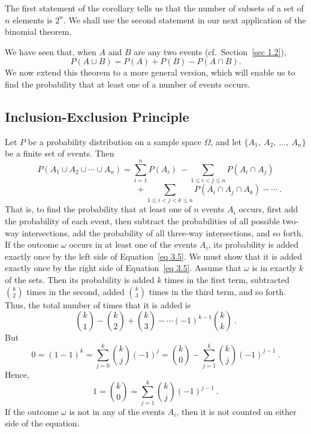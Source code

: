 The first statement of the corollary tells us that the number of subsets of a set of
$n$ elements is $2^n$.  We shall use the second statement in our next application of
the binomial theorem.

We have seen that, when $A$ and $B$ are any two events (cf.~Section~\ref{sec 1.2}),  
$$ P(A \cup B) = P(A) + P(B) - P(A \cap B).
$$ We now extend this theorem to a more general version, which will enable us to find
the probability that at least one of a number of events occurs.

\subsection*{Inclusion-Exclusion Principle}

\begin{theorem}\label{thm 3.10} Let $P$ be a probability distribution on a sample space
$\Omega$, and let
$\{A_1,\ A_2,\ \dots,\ A_n\}$ be a finite set of events.  Then
$$ P(A_1 \cup A_2 \cup \cdots \cup A_n)  =  \sum_{i = 1}^n P(A_i)\ - 
\sum_{1 \leq i < j \leq n} P(A_i \cap A_j) 
$$
\begin{equation} 
\ \ \ \ \ \ \ \ \ \ \ \ \ \ \ \ \ \ \ \ \ \ \ \ \ \ \ \ \ \ \ \ \ \ \ \ \ \ \ \ \ \ \
\ 
\ \ \ \ \ \ \ \ \ \ \ \ \  + \sum_{1 \leq i < j < k \leq n} P(A_i \cap A_j \cap A_k) -
\cdots\ .\label{eq 3.5}
\end{equation}
That is, to find the probability that at least one of $n$ events $A_i$ occurs, first add the
probability of each event, then subtract the probabilities of all possible two-way
intersections, add the probability of all three-way intersections, and so forth.
\proof If the outcome $\omega$ occurs in at least one of the events $A_i$, its probability is added
exactly once by the left side of Equation~\ref{eq 3.5}.  We must show that it is added
exactly once by the right side of  Equation~\ref{eq 3.5}.  Assume that $\omega$ is in
exactly $k$ of the sets.   Then its probability is added $k$ times in the first term,
subtracted $k \choose 2$  times in the second, added $k \choose 3$ times in the third
term, and so forth.   Thus, the total number of times that it is added is
$$ {k \choose 1} - {k \choose 2} + {k \choose 3} - \cdots {(-1)^{k-1}} {k \choose k}\ .
$$ But
$$ 0 = (1 - 1)^k = \sum_{j = 0}^k {k \choose j} (-1)^j = {k \choose 0} - \sum_{j = 1}^k
{k \choose j} {(-1)^{j - 1}}\ .
$$ Hence,
$$ 1 = {k \choose 0} = \sum_{j = 1}^k {k \choose j} {(-1)^{j - 1}}\ .
$$
If the outcome $\omega$ is not in any of the events $A_i$, then it is not counted on either side of
the equation.
\end{theorem}

